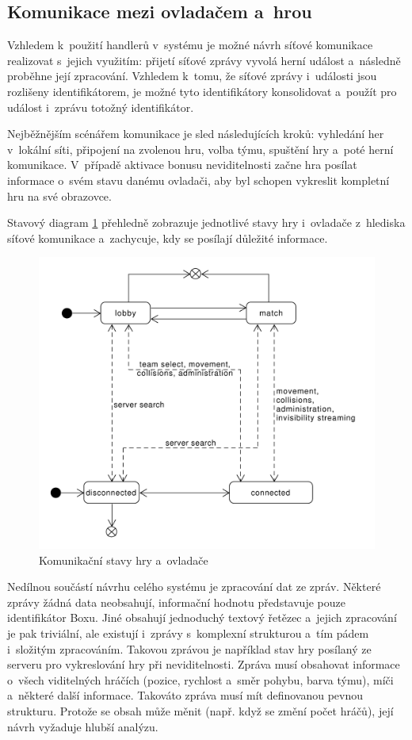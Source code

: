 \documentclass[thesis=B,czech,hidelinks]{FITthesis}[2012/06/26] %
\begin{document}
\subsection{Komunikace mezi ovladačem a~hrou}

Vzhledem k~použití handlerů v~systému je možné návrh síťové komunikace realizovat s~jejich využitím: přijetí síťové zprávy vyvolá herní událost a~následně proběhne její zpracování. Vzhledem k~tomu, že síťové zprávy i~události jsou rozlišeny identifikátorem, je možné tyto identifikátory konsolidovat a~použít pro událost i~zprávu totožný identifikátor. 

Nejběžnějším scénářem komunikace je sled následujících kroků: vyhledání her v~lokální síti, připojení na zvolenou hru, volba týmu, spuštění hry a~poté herní komunikace. V~případě aktivace bonusu neviditelnosti začne hra posílat informace o~svém stavu danému ovladači, aby byl schopen vykreslit kompletní hru na své obrazovce.

Stavový diagram \ref{picture:communication_states} přehledně zobrazuje jednotlivé stavy hry i~ovladače z~hlediska síťové komunikace a~zachycuje, kdy se posílají důležité informace.

\begin{figure}[h]
\includegraphics[width=\textwidth]{communication_states}
\caption{Komunikační stavy hry a~ovladače}
\label{picture:communication_states}
\end{figure}

Nedílnou součástí návrhu celého systému je zpracování dat ze zpráv. Některé zprávy žádná data neobsahují, informační hodnotu představuje pouze identifikátor Boxu. Jiné obsahují jednoduchý textový řetězec a~jejich zpracování je pak triviální, ale existují i~zprávy s~komplexní strukturou a~tím pádem i~složitým zpracováním. Takovou zprávou je například stav hry posílaný ze serveru pro vykreslování hry při neviditelnosti. Zpráva musí obsahovat informace o~všech viditelných hráčích (pozice, rychlost a~směr pohybu, barva týmu), míči a~některé další informace. Takováto zpráva musí mít definovanou pevnou strukturu. Protože se obsah může měnit (např. když se změní počet hráčů), její návrh vyžaduje hlubší analýzu.
\end{document}
